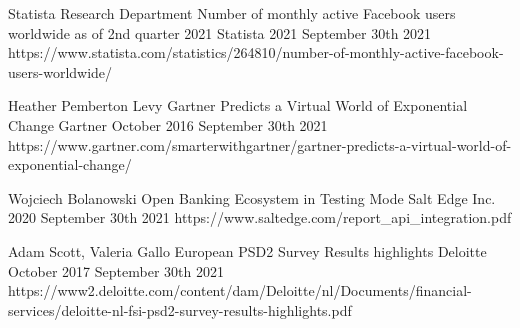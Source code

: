 \begin{thebibliography}{100}
{Statista Research Department}
{Number of monthly active Facebook users worldwide as of 2nd quarter 2021}
{Statista}
{2021}
{September 30th 2021}
{https://www.statista.com/statistics/264810/number-of-monthly-active-facebook-users-worldwide/}

{Heather Pemberton Levy}
{Gartner Predicts a Virtual World of Exponential Change}
{Gartner}
{October 2016}
{September 30th 2021}
{https://www.gartner.com/smarterwithgartner/gartner-predicts-a-virtual-world-of-exponential-change/}

{Wojciech Bolanowski}
{Open Banking Ecosystem in Testing Mode}
{Salt Edge Inc.}
{2020}
{September 30th 2021}
{https://www.saltedge.com/report\_api\_integration.pdf}

{Adam Scott, Valeria Gallo}
{European PSD2 Survey Results highlights}
{Deloitte}
{October 2017}
{September 30th 2021}
{https://www2.deloitte.com/content/dam/Deloitte/nl/Documents/financial-services/deloitte-nl-fsi-psd2-survey-results-highlights.pdf}

\end{thebibliography}
